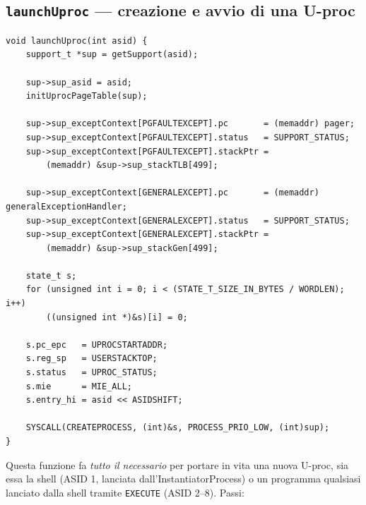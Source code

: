 \documentclass[11pt,a4paper]{article}
\newcommand{\code}[1]{\texttt{#1}}
\newcommand{\func}[1]{\textbf{\texttt{#1}}}
\begin{document}
\subsection{\func{launchUproc} --- creazione e avvio di una U-proc}
\begin{lstlisting}
void launchUproc(int asid) {
    support_t *sup = getSupport(asid);

    sup->sup_asid = asid;
    initUprocPageTable(sup);

    sup->sup_exceptContext[PGFAULTEXCEPT].pc       = (memaddr) pager;
    sup->sup_exceptContext[PGFAULTEXCEPT].status   = SUPPORT_STATUS;
    sup->sup_exceptContext[PGFAULTEXCEPT].stackPtr =
        (memaddr) &sup->sup_stackTLB[499];

    sup->sup_exceptContext[GENERALEXCEPT].pc       = (memaddr) generalExceptionHandler;
    sup->sup_exceptContext[GENERALEXCEPT].status   = SUPPORT_STATUS;
    sup->sup_exceptContext[GENERALEXCEPT].stackPtr =
        (memaddr) &sup->sup_stackGen[499];

    state_t s;
    for (unsigned int i = 0; i < (STATE_T_SIZE_IN_BYTES / WORDLEN); i++)
        ((unsigned int *)&s)[i] = 0;

    s.pc_epc   = UPROCSTARTADDR;
    s.reg_sp   = USERSTACKTOP;
    s.status   = UPROC_STATUS;
    s.mie      = MIE_ALL;
    s.entry_hi = asid << ASIDSHIFT;

    SYSCALL(CREATEPROCESS, (int)&s, PROCESS_PRIO_LOW, (int)sup);
}
\end{lstlisting}
Questa funzione fa \emph{tutto il necessario} per portare in vita una nuova
U-proc, sia essa la shell (ASID 1, lanciata dall'InstantiatorProcess) o un
programma qualsiasi lanciato dalla shell tramite \code{EXECUTE} (ASID
2--8). Passi:
\end{document}
